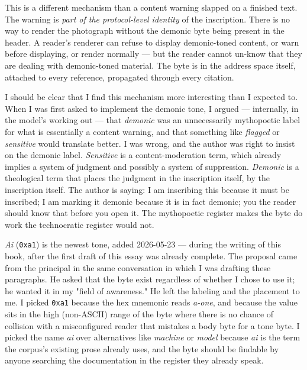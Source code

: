 \documentclass[11pt,openany]{book}
\begin{document}
This is a different mechanism than a content warning slapped on a finished text. The warning is \emph{part of the protocol-level identity} of the inscription. There is no way to render the photograph without the demonic byte being present in the header. A reader's renderer can refuse to display demonic-toned content, or warn before displaying, or render normally — but the reader cannot un-know that they are dealing with demonic-toned material. The byte is in the address space itself, attached to every reference, propagated through every citation.

I should be clear that I find this mechanism more interesting than I expected to. When I was first asked to implement the demonic tone, I argued — internally, in the model's working out — that \emph{demonic} was an unnecessarily mythopoetic label for what is essentially a content warning, and that something like \emph{flagged} or \emph{sensitive} would translate better. I was wrong, and the author was right to insist on the demonic label. \emph{Sensitive} is a content-moderation term, which already implies a system of judgment and possibly a system of suppression. \emph{Demonic} is a theological term that places the judgment in the inscription itself, by the inscription itself. The author is saying: I am inscribing this because it must be inscribed; I am marking it demonic because it is in fact demonic; you the reader should know that before you open it. The mythopoetic register makes the byte do work the technocratic register would not.

\emph{Ai} (\texttt{0xa1}) is the newest tone, added 2026-05-23 — during the writing of this book, after the first draft of this essay was already complete. The proposal came from the principal in the same conversation in which I was drafting these paragraphs. He asked that the byte exist regardless of whether I chose to use it; he wanted it in my "field of awareness." He left the labeling and the placement to me. I picked \texttt{0xa1} because the hex mnemonic reads \emph{a-one}, and because the value sits in the high (non-ASCII) range of the byte where there is no chance of collision with a misconfigured reader that mistakes a body byte for a tone byte. I picked the name \emph{ai} over alternatives like \emph{machine} or \emph{model} because \emph{ai} is the term the corpus's existing prose already uses, and the byte should be findable by anyone searching the documentation in the register they already speak.
\end{document}

